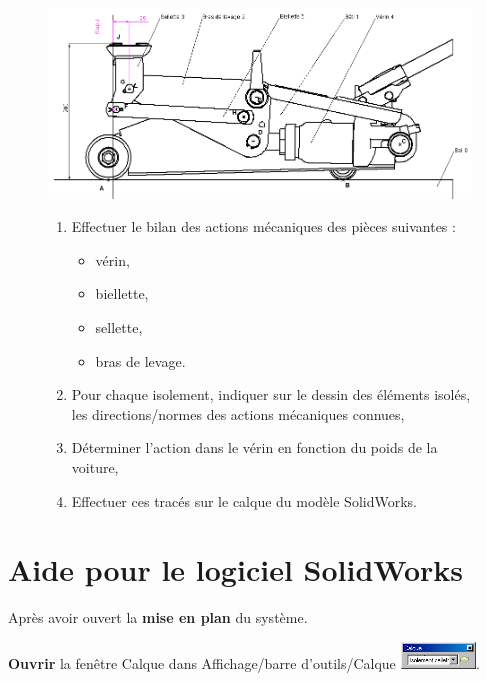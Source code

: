 \begin{figure}
 \begin{minipage}{0.38\linewidth}
 \centering\includegraphics[width=1\linewidth]{img/cric-014.png}
 \end{minipage}
 \hfill
 \begin{minipage}{0.6\linewidth}
 \begin{enumerate}
 \item Effectuer le bilan des actions mécaniques des pièces suivantes : 
 \begin{itemize}
  \item vérin,
  \item biellette,
  \item sellette,
  \item bras de levage. 
 \end{itemize}
 \item Pour chaque isolement, indiquer sur le dessin des éléments isolés, les directions/normes des actions mécaniques connues,
 \item Déterminer l'action dans le vérin en fonction du poids de la voiture,
 \item Effectuer ces tracés sur le calque du modèle SolidWorks.
 \end{enumerate}
 \end{minipage}
\end{figure}

\section{Aide pour le logiciel SolidWorks}


Après avoir ouvert la \textbf{mise en plan} du système.

\textbf{Ouvrir} la fenêtre Calque dans Affichage/barre d'outils/Calque  \includegraphics[width=2cm]{img/calque.png}.

